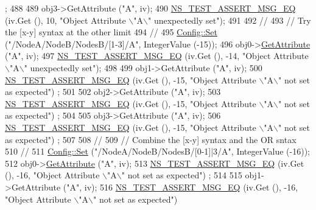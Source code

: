 \begin{DoxyCode}
      ;
488 
489   obj3->GetAttribute (\textcolor{stringliteral}{"A"}, iv);
490   \hyperlink{group__testing_ga2a9d78cffb3db8e867c35fff0b698cf5}{NS\_TEST\_ASSERT\_MSG\_EQ} (iv.Get (), 10, \textcolor{stringliteral}{"Object Attribute \(\backslash\)"A\(\backslash\)" unexpectedly set"});
491 
492   \textcolor{comment}{//}
493   \textcolor{comment}{// Try the [x-y] syntax at the other limit}
494   \textcolor{comment}{//}
495   \hyperlink{group__config_gadce03667ec621d64ce4aace85d9bcfd0}{Config::Set} (\textcolor{stringliteral}{"/NodeA/NodeB/NodesB/[1-3]/A"}, IntegerValue (-15));
496   obj0->\hyperlink{classns3_1_1ObjectBase_a895d1de2f96063d0e0fd78463e7a7e30}{GetAttribute} (\textcolor{stringliteral}{"A"}, iv);
497   \hyperlink{group__testing_ga2a9d78cffb3db8e867c35fff0b698cf5}{NS\_TEST\_ASSERT\_MSG\_EQ} (iv.Get (), -14, \textcolor{stringliteral}{"Object Attribute \(\backslash\)"A\(\backslash\)" unexpectedly set"});
498 
499   obj1->GetAttribute (\textcolor{stringliteral}{"A"}, iv);
500   \hyperlink{group__testing_ga2a9d78cffb3db8e867c35fff0b698cf5}{NS\_TEST\_ASSERT\_MSG\_EQ} (iv.Get (), -15, \textcolor{stringliteral}{"Object Attribute \(\backslash\)"A\(\backslash\)" not set as expected"})
      ;
501 
502   obj2->GetAttribute (\textcolor{stringliteral}{"A"}, iv);
503   \hyperlink{group__testing_ga2a9d78cffb3db8e867c35fff0b698cf5}{NS\_TEST\_ASSERT\_MSG\_EQ} (iv.Get (), -15, \textcolor{stringliteral}{"Object Attribute \(\backslash\)"A\(\backslash\)" not set as expected"})
      ;
504 
505   obj3->GetAttribute (\textcolor{stringliteral}{"A"}, iv);
506   \hyperlink{group__testing_ga2a9d78cffb3db8e867c35fff0b698cf5}{NS\_TEST\_ASSERT\_MSG\_EQ} (iv.Get (), -15, \textcolor{stringliteral}{"Object Attribute \(\backslash\)"A\(\backslash\)" not set as expected"})
      ;
507 
508   \textcolor{comment}{//}
509   \textcolor{comment}{// Combine the [x-y] syntax and the OR sntax}
510   \textcolor{comment}{//}
511   \hyperlink{group__config_gadce03667ec621d64ce4aace85d9bcfd0}{Config::Set} (\textcolor{stringliteral}{"/NodeA/NodeB/NodesB/[0-1]|3/A"}, IntegerValue (-16));
512   obj0->\hyperlink{classns3_1_1ObjectBase_a895d1de2f96063d0e0fd78463e7a7e30}{GetAttribute} (\textcolor{stringliteral}{"A"}, iv);
513   \hyperlink{group__testing_ga2a9d78cffb3db8e867c35fff0b698cf5}{NS\_TEST\_ASSERT\_MSG\_EQ} (iv.Get (), -16, \textcolor{stringliteral}{"Object Attribute \(\backslash\)"A\(\backslash\)" not set as expected"})
      ;
514 
515   obj1->GetAttribute (\textcolor{stringliteral}{"A"}, iv);
516   \hyperlink{group__testing_ga2a9d78cffb3db8e867c35fff0b698cf5}{NS\_TEST\_ASSERT\_MSG\_EQ} (iv.Get (), -16, \textcolor{stringliteral}{"Object Attribute \(\backslash\)"A\(\backslash\)" not set as expected"})

\end{DoxyCode}
